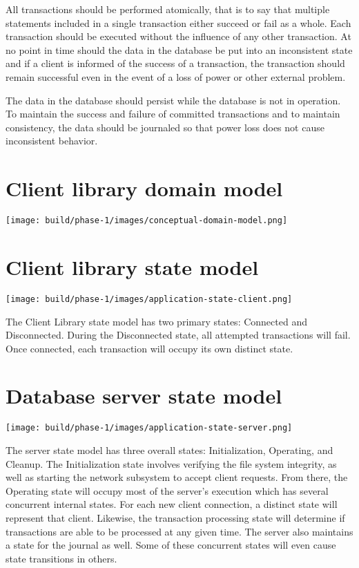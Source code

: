 \documentclass[a4paper]{report}
\begin{document}
	All transactions should be performed atomically, that is to say that multiple statements included in a single transaction either succeed or fail as a whole. Each transaction should be executed without the influence of any other transaction. At no point in time should the data in the database be put into an inconsistent state and if a client is informed of the success of a transaction, the transaction should remain successful even in the event of a loss of power or other external problem.

	The data in the database should persist while the database is not in operation. To maintain the success and failure of committed transactions and to maintain consistency, the data should be journaled so that power loss does not cause inconsistent behavior.

\section{Client library domain model}

	\texttt{[image: build/phase-1/images/conceptual-domain-model.png]}


\section{Client library state model}
	
	\begin{center}
		\texttt{[image: build/phase-1/images/application-state-client.png]}
	\end{center}

	The Client Library state model has two primary states: Connected and Disconnected. During the Disconnected state, all attempted transactions will fail. Once connected, each transaction will occupy its own distinct state.

\section{Database server state model}

	\texttt{[image: build/phase-1/images/application-state-server.png]}

	The server state model has three overall states: Initialization, Operating, and Cleanup. The Initialization state involves verifying the file system integrity, as well as starting the network subsystem to accept client requests. From there, the Operating state will occupy most of the server's execution which has several concurrent internal states. For each new client connection, a distinct state will represent that client. Likewise, the transaction processing state will determine if transactions are able to be processed at any given time. The server also maintains a state for the journal as well. Some of these concurrent states will even cause state transitions in others.
\end{document}
